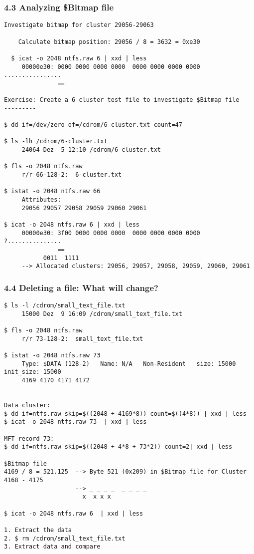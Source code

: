 \begin{frame}[fragile]
  \frametitle{4.3 Analyzing \$Bitmap file}
  \begin{lstlisting}[basicstyle=\tiny]
Investigate bitmap for cluster 29056-29063

    Calculate bitmap position: 29056 / 8 = 3632 = 0xe30
  
  $ icat -o 2048 ntfs.raw 6 | xxd | less
     00000e30: 0000 0000 0000 0000  0000 0000 0000 0000  ................
               ==

Exercise: Create a 6 cluster test file to investigate $Bitmap file
---------

$ dd if=/dev/zero of=/cdrom/6-cluster.txt count=47

$ ls -lh /cdrom/6-cluster.txt 
     24064 Dez  5 12:10 /cdrom/6-cluster.txt

$ fls -o 2048 ntfs.raw
     r/r 66-128-2:	6-cluster.txt

$ istat -o 2048 ntfs.raw 66
     Attributes: 
     29056 29057 29058 29059 29060 29061

$ icat -o 2048 ntfs.raw 6 | xxd | less
     00000e30: 3f00 0000 0000 0000  0000 0000 0000 0000  ?...............
               ==
           0011  1111
     --> Allocated clusters: 29056, 29057, 29058, 29059, 29060, 29061
  \end{lstlisting}
\end{frame}


\begin{frame}[fragile]
  \frametitle{4.4 Deleting a file: What will change?}
  \begin{lstlisting}[basicstyle=\tiny]
$ ls -l /cdrom/small_text_file.txt 
     15000 Dez  9 16:09 /cdrom/small_text_file.txt
  
$ fls -o 2048 ntfs.raw 
     r/r 73-128-2:	small_text_file.txt

$ istat -o 2048 ntfs.raw 73
     Type: $DATA (128-2)   Name: N/A   Non-Resident   size: 15000  init_size: 15000
     4169 4170 4171 4172
  

Data cluster:
$ dd if=ntfs.raw skip=$((2048 + 4169*8)) count=$((4*8)) | xxd | less
$ icat -o 2048 ntfs.raw 73  | xxd | less
  
MFT record 73: 
$ dd if=ntfs.raw skip=$((2048 + 4*8 + 73*2)) count=2| xxd | less

$Bitmap file
4169 / 8 = 521.125  --> Byte 521 (0x209) in $Bitmap file for Cluster 4168 - 4175
                    --> _ _ _ _  _ _ _ _
		              x  x x x   

$ icat -o 2048 ntfs.raw 6  | xxd | less

1. Extract the data
2. $ rm /cdrom/small_text_file.txt
3. Extract data and compare
  \end{lstlisting}
\end{frame}



